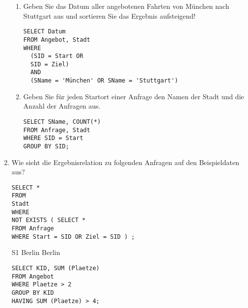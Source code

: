 \documentclass{lehramt-informatik-minimal}
\begin{document}
\begin{enumerate}
\begin{enumerate}
%

\item Geben Sie das Datum aller angebotenen Fahrten von München nach
Stuttgart aus und sortieren Sie das Ergebnis aufsteigend!

\begin{verbatim}
SELECT Datum
FROM Angebot, Stadt
WHERE
  (SID = Start OR
  SID = Ziel)
  AND
  (SName = 'München' OR SName = 'Stuttgart')
\end{verbatim}

%

\item Geben Sie für jeden Startort einer Anfrage den Namen der Stadt und
die Anzahl der Anfragen aus.

\begin{verbatim}
SELECT SName, COUNT(*)
FROM Anfrage, Stadt
WHERE SID = Start
GROUP BY SID;
\end{verbatim}

\end{enumerate}

\item Wie sieht die Ergebnisrelation zu folgenden Anfragen auf den
Beispieldaten aus?

\begin{verbatim}
SELECT *
FROM
Stadt
WHERE
NOT EXISTS ( SELECT *
FROM Anfrage
WHERE Start = SID OR Ziel = SID ) ;
\end{verbatim}

\begin{antwort}
S1 Berlin Berlin
\end{antwort}

\begin{verbatim}
SELECT KID, SUM (Plaetze)
FROM Angebot
WHERE Plaetze > 2
GROUP BY KID
HAVING SUM (Plaetze) > 4;
\end{verbatim}

\end{enumerate}
\end{document}
